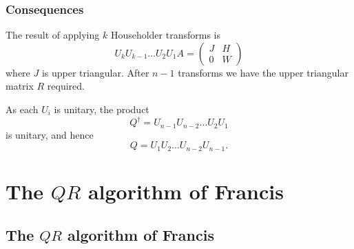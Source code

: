 \documentclass{beamer}
\begin{document}
\begin{frame}
\begin{overlayarea}{\textwidth}{0.4\textheight}
  \end{overlayarea}


\end{frame}


\begin{frame}
  \frametitle{Consequences}

  The result of applying $k$ Householder transforms is
  \begin{equation*}
    U_k U_{k-1} \dots U_2 U_1 A = \left(
      \begin{array}{c|c}
        J & H \\ \hline 0 & W
      \end{array}\right)
  \end{equation*}
  where $J$ is upper triangular. After $n-1$ transforms we have the
  upper triangular matrix $R$ required. \pause

  \vspace{1ex}

  As each $U_i$ is unitary, the product
  \begin{equation*}
    Q^{\dagger} = U_{n-1} U_{n-2} \dots U_2 U_1
  \end{equation*}
  is unitary, and hence
  \begin{equation*}
    Q = U_1 U_2 \dots U_{n-2} U_{n-1}.
  \end{equation*}

\end{frame}


\section{\texorpdfstring{The $QR$ algorithm of Francis}{The QR
    algorithm of Francis}}


\subsection{\texorpdfstring{The $QR$ algorithm of Francis}{The QR
    algorithm of Francis}}
\end{document}
